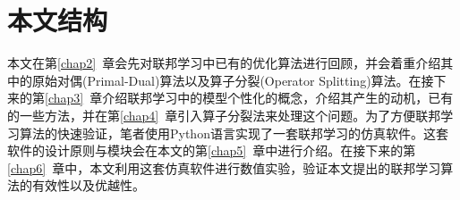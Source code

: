 \section{本文结构}
\label{sec:chap1-structure}


本文在第\ref{chap2}~章会先对联邦学习中已有的优化算法进行回顾，并会着重介绍其中的原始对偶(Primal-Dual)算法以及算子分裂(Operator Splitting)算法。在接下来的第\ref{chap3}~章介绍联邦学习中的模型个性化的概念，介绍其产生的动机，已有的一些方法，并在第\ref{chap4}~章引入算子分裂法来处理这个问题。为了方便联邦学习算法的快速验证，笔者使用Python语言实现了一套联邦学习的仿真软件。这套软件的设计原则与模块会在本文的第\ref{chap5}~章中进行介绍。在接下来的第\ref{chap6}~章中，本文利用这套仿真软件进行数值实验，验证本文提出的联邦学习算法的有效性以及优越性。
